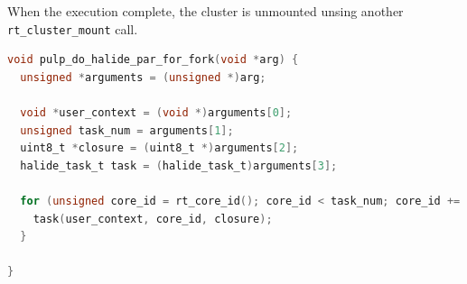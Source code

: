 	When the execution complete, the cluster is unmounted unsing another \texttt{rt\_cluster\_mount} call.

\begin{lstlisting}[language=C,caption={The \texttt{halide\_do\_par\_for\_fork} function.},label={lst:halidedoparforfork},captionpos=b]
void pulp_do_halide_par_for_fork(void *arg) {
  unsigned *arguments = (unsigned *)arg;

  void *user_context = (void *)arguments[0];
  unsigned task_num = arguments[1];
  uint8_t *closure = (uint8_t *)arguments[2];
  halide_task_t task = (halide_task_t)arguments[3];

  for (unsigned core_id = rt_core_id(); core_id < task_num; core_id += (int)&__rt_nb_pe) {
    task(user_context, core_id, closure);
  }

}
\end{lstlisting}

